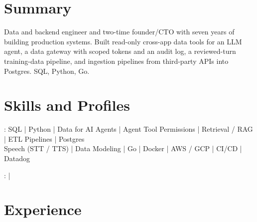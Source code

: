 \documentclass[print]{jack-resume}
\begin{document}
\pagecolor{darkmodeBackground}


\begin{minipage}[t][1cm][t]{.03\textwidth}
    \hfill
\end{minipage}

\section{Summary}
Data and backend engineer and two-time founder/CTO with seven years of building production systems. Built read-only cross-app data tools for an LLM agent, a data gateway with scoped tokens and an audit log, a reviewed-turn training-data pipeline, and ingestion pipelines from third-party APIs into Postgres. SQL, Python, Go.
\sectionsep

\section{Skills and Profiles}
:
SQL \hfill | \hfill
Python \hfill | \hfill
Data for AI Agents \hfill | \hfill
Agent Tool Permissions \hfill | \hfill
Retrieval / RAG \hfill | \hfill
ETL Pipelines \hfill | \hfill
Postgres \\
\hspace{1.0cm} Speech (STT / TTS) \hfill | \hfill
Data Modeling \hfill | \hfill
Go \hfill | \hfill
Docker \hfill | \hfill
AWS / GCP \hfill | \hfill
CI/CD \hfill | \hfill
Datadog \\

\raggedright{
    :
      \href{https://www.linkedin.com/in/jack-sturtevant/}{ \ExternalLink} |
     \href{https://github.com/jacksturt}{ \ExternalLink}}

\section{Experience}
\end{document}

